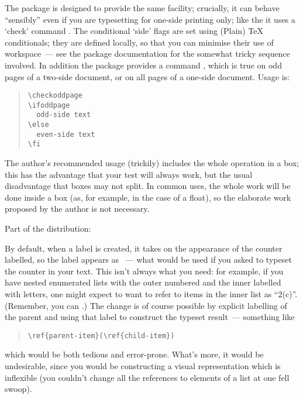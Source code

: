 The package  is designed to provide the same
facility; crucially, it can behave ``sensibly'' even if you are
typesetting for one-side printing only; like the 
it uses a `check' command .  The conditional `side'
flags are set using (Plain) \TeX{} conditionals; they are defined
locally, so that you can minimise their use of \tex{} workspace~---
see the package documentation for the somewhat tricky sequence
involved.  In addition the package provides a command
, which is true on odd pages of a two-side
document, or on all pages of a one-side document.  Usage is:
\begin{quote}
\begin{verbatim}
\checkoddpage
\ifoddpage
  odd-side text
\else
  even-side text
\fi
\end{verbatim}
\end{quote}
The author's recommended usage (trickily) includes the whole operation
in a box; this has the advantage that your test will always work, but
the usual disadvantage that boxes may not split.  In common uses, the
whole work will be done inside a box (as, for example, in the case of
a float), so the elaborate work proposed by the author is not
necessary.
\begin{ctanrefs}
\item[changepage.sty]
\item[ifoddpage.sty]
\item[ifthen.sty]Part of the \latex{} distribution: 
\item[\nothtml{\rmfamily}KOMA script bundle]
\item[memoir.cls]
\end{ctanrefs}


By default, when a label is created, it takes on the appearance of the
counter labelled, so the label appears as
\texttt{}~--- what would be used if you
asked to typeset the counter in your text.  This isn't always what you
need: for example, if you have nested enumerated lists with the outer
numbered and the inner labelled with letters, one might expect to want
to refer to items in the inner list as ``2(c)''.   (Remember, you can
%
.)
The change is of course
possible by explicit labelling of the parent and using that label to
construct the typeset result~--- something like
\begin{quote}
\begin{verbatim}
\ref{parent-item}(\ref{child-item})
\end{verbatim}
\end{quote}
which would be both tedious and error-prone.  What's more, it would be
undesirable, since you would be constructing a visual representation
which is inflexible (you couldn't change all the references to elements
of a list at one fell swoop).

